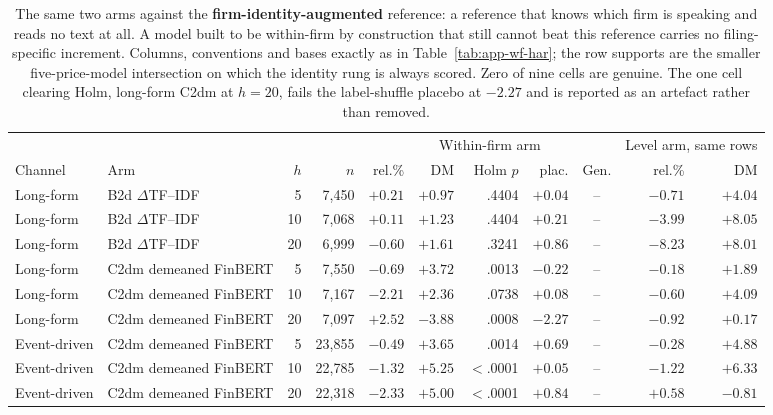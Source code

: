 \begin{table}[htbp]
\centering
\caption[Within-firm text arms against the firm-identity reference]{The
same two arms against the \textbf{firm-identity-augmented} reference: a
reference that knows which firm is speaking and reads no text at all. A
model built to be within-firm by construction that still cannot beat this
reference carries no filing-specific increment. Columns, conventions and
bases exactly as in Table~\ref{tab:app-wf-har}; the row supports are the
smaller five-price-model intersection on which the identity rung is always
scored. Zero of nine cells are genuine. The one cell clearing Holm,
long-form C2dm at $h{=}20$, fails the label-shuffle placebo at $-2.27$
and is reported as an artefact rather than removed.}
\label{tab:app-wf-firm}
\singlespacing\footnotesize
\setlength{\tabcolsep}{2pt}
\begin{tabular}{@{}llrrrrrrcrr@{}}
\toprule
& & & & \multicolumn{5}{c}{Within-firm arm} & \multicolumn{2}{c}{Level arm, same rows} \\
\cmidrule(lr){5-9}\cmidrule(lr){10-11}
Channel & Arm & $h$ & $n$ & rel.\% & DM & Holm $p$ & plac. & Gen. & rel.\% & DM \\
\midrule
Long-form & B2d $\Delta$TF--IDF & 5 & 7{,}450 & $+0.21$ & $+0.97$ & .4404 & $+0.04$ & -- & $-0.71$ & $+4.04$ \\
Long-form & B2d $\Delta$TF--IDF & 10 & 7{,}068 & $+0.11$ & $+1.23$ & .4404 & $+0.21$ & -- & $-3.99$ & $+8.05$ \\
Long-form & B2d $\Delta$TF--IDF & 20 & 6{,}999 & $-0.60$ & $+1.61$ & .3241 & $+0.86$ & -- & $-8.23$ & $+8.01$ \\
\addlinespace
Long-form & C2dm demeaned FinBERT & 5 & 7{,}550 & $-0.69$ & $+3.72$ & .0013 & $-0.22$ & -- & $-0.18$ & $+1.89$ \\
Long-form & C2dm demeaned FinBERT & 10 & 7{,}167 & $-2.21$ & $+2.36$ & .0738 & $+0.08$ & -- & $-0.60$ & $+4.09$ \\
Long-form & C2dm demeaned FinBERT & 20 & 7{,}097 & $+2.52$ & $-3.88$ & .0008 & $-2.27$ & -- & $-0.92$ & $+0.17$ \\
\addlinespace
Event-driven & C2dm demeaned FinBERT & 5 & 23{,}855 & $-0.49$ & $+3.65$ & .0014 & $+0.69$ & -- & $-0.28$ & $+4.88$ \\
Event-driven & C2dm demeaned FinBERT & 10 & 22{,}785 & $-1.32$ & $+5.25$ & $<$.0001 & $+0.05$ & -- & $-1.22$ & $+6.33$ \\
Event-driven & C2dm demeaned FinBERT & 20 & 22{,}318 & $-2.33$ & $+5.00$ & $<$.0001 & $+0.84$ & -- & $+0.58$ & $-0.81$ \\
\bottomrule
\end{tabular}
\end{table}

